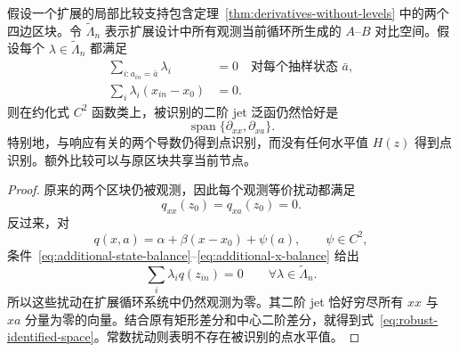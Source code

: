 \begin{proposition}[额外比较]
\label{prop:additional-comparisons}
假设一个扩展的局部比较支持包含定理~\ref{thm:derivatives-without-levels} 中的两个四边区块。令 $\widetilde\Lambda_n$ 表示扩展设计中所有观测当前循环所生成的 $A$--$B$ 对比空间。假设每个 $\lambda\in\widetilde\Lambda_n$ 都满足
\begin{align}
\sum_{i:a_{in}=\bar a}\lambda_i&=0
\quad\text{对每个抽样状态 }\bar a,
\label{eq:additional-state-balance}\\
\sum_i\lambda_i(x_{in}-x_0)&=0.
\label{eq:additional-x-balance}
\end{align}
则在约化式 $C^2$ 函数类上，被识别的二阶 jet 泛函仍然恰好是
\begin{equation}
\boxed{\operatorname{span}\{\partial_{xx},\partial_{xa}\}.}
\label{eq:robust-identified-space}
\end{equation}
特别地，与响应有关的两个导数仍得到点识别，而没有任何水平值 $H(z)$ 得到点识别。额外比较可以与原区块共享当前节点。
\end{proposition}

\begin{proof}
原来的两个区块仍被观测，因此每个观测等价扰动都满足
\[
q_{xx}(z_0)=q_{xa}(z_0)=0.
\]
反过来，对
\[
q(x,a)=\alpha+\beta(x-x_0)+\psi(a),
\qquad \psi\in C^2,
\]
条件~\eqref{eq:additional-state-balance}--\eqref{eq:additional-x-balance} 给出
\[
\sum_i\lambda_iq(z_{in})=0
\qquad
\forall\lambda\in\widetilde\Lambda_n.
\]
所以这些扰动在扩展循环系统中仍然观测为零。其二阶 jet 恰好穷尽所有 $xx$ 与 $xa$ 分量为零的向量。结合原有矩形差分和中心二阶差分，就得到式~\eqref{eq:robust-identified-space}。常数扰动则表明不存在被识别的点水平值。
\end{proof}
